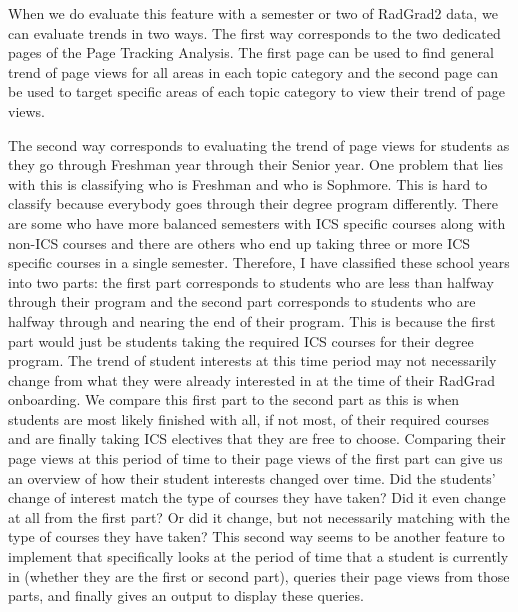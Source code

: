 \documentclass[english]{proposalnsf}
\begin{document}
    When we do evaluate this feature with a semester or two of RadGrad2 data, we can evaluate trends in two ways. The first
    way corresponds to the two dedicated pages of the Page Tracking Analysis. The first page can be used to find general
    trend of page views for all areas in each topic category and the second page can be used to target specific areas of
    each topic category to view their trend of page views.

    The second way corresponds to evaluating the trend of page views for students as they go through Freshman year through
    their Senior year. One problem that lies with this is classifying who is Freshman and who is Sophmore. This is hard to
    classify because everybody goes through their degree program differently. There are some who have more balanced semesters
    with ICS specific courses along with non-ICS courses and there are others who end up taking three or more ICS specific
    courses in a single semester. Therefore, I have classified these school years into two parts: the first part corresponds
    to students who are less than halfway through their program and the second part corresponds to students who are halfway
    through and nearing the end of their program. This is because the first part would just be students taking the required
    ICS courses for their degree program. The trend of student interests at this time period may not necessarily change from
    what they were already interested in at the time of their RadGrad onboarding. We compare this first part to the second part
    as this is when students are most likely finished with all, if not most, of their required courses and are finally taking
    ICS electives that they are free to choose. Comparing their page views at this period of time to their page views of the first
    part can give us an overview of how their student interests changed over time. Did the students' change of interest match
    the type of courses they have taken? Did it even change at all from the first part? Or did it change, but not necessarily
    matching with the type of courses they have taken? This second way seems to be another feature to implement that
    specifically looks at the period of time that a student is currently in (whether they are the first or second part),
    queries their page views from those parts, and finally gives an output to display these queries.

    \appendix
\end{document}
